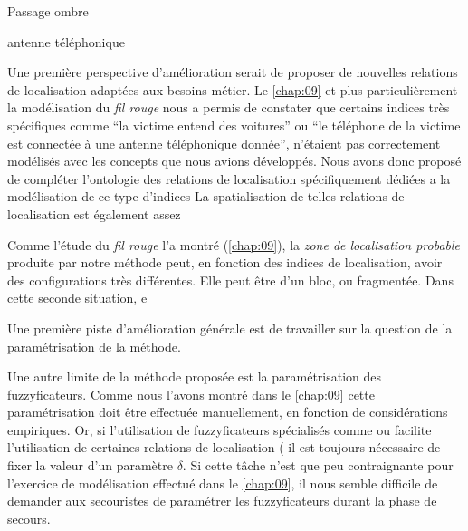 Passage ombre

antenne téléphonique

Une première perspective d'amélioration serait de proposer de
nouvelles relations de localisation adaptées aux besoins métier. Le
\autoref{chap:09} et plus particulièrement la modélisation du
\emph{fil rouge} nous a permis de constater que certains indices très
spécifiques comme \enquote{la victime entend des voitures} ou
\enquote{le téléphone de la victime est connectée à une antenne
  téléphonique donnée}, n'étaient pas correctement modélisés avec les
concepts que nous avions développés.
%
Nous avons donc proposé de compléter l'ontologie des relations de
localisation spécifiquement dédiées a la modélisation de ce type
d'indices
%
La spatialisation de telles relations de localisation est également
assez 



Comme l'étude du \emph{fil rouge} l'a montré (\autoref{chap:09}), la
\emph{zone de localisation probable} produite par notre méthode peut,
en fonction des indices de localisation, avoir des configurations très
différentes. Elle peut être d'un bloc, ou fragmentée. Dans cette
seconde situation,  e




Une première piste d'amélioration générale est de travailler sur la
question de la paramétrisation de la méthode. 


Une autre limite de la méthode proposée est la paramétrisation des
fuzzyficateurs. Comme nous l'avons montré dans le \autoref{chap:09}
cette paramétrisation doit être effectuée manuellement, en fonction de
considérations empiriques. Or, si l'utilisation de fuzzyficateurs
spécialisés comme  ou 
facilite l'utilisation de certaines relations de localisation (\eg
{} il est toujours nécessaire de fixer la valeur
d'un paramètre \(\delta\). Si cette tâche n'est que peu contraignante
pour l'exercice de modélisation effectué dans le \autoref{chap:09}, il
nous semble difficile de demander aux secouristes de paramétrer les
fuzzyficateurs durant la phase de secours.

